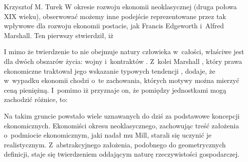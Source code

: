 \begin{artplenv}{Krzysztof M. Turek}
W okresie rozwoju ekonomii neoklasycznej (druga połowa XIX wieku), obserwować możemy inne podejście reprezentowane przez
tak wpływowe dla rozwoju ekonomii postacie, jak Francis Edgeworth i~Alfred Marshall. Ten pierwszy
\parencite[s.~16]{edgeworth_mathematical_1881}
stwierdził, iż 

I mimo że twierdzenie to nie obejmuje natury człowieka w~całości, właściwe jest dla dwóch obszarów życia:
wojny i~kontraktów
\parencite[s.~52]{edgeworth_mathematical_1881}.
Z~kolei Marshall , który prawa ekonomiczne traktował jego
wskazanie typowych tendencji
\parencite[s.~94-95]{marshall_zasady_1925},
dodaje, że w~wypadku ekonomii
chodzi o~te zachowania, których motywy można mierzyć ceną pieniężną. I~pomimo iż przyznaje on, że pomiędzy jednostkami mogą
zachodzić różnice, to:


Na takim gruncie powstało wiele uznawanych do dziś za podstawowe koncepcji ekonomicznych. Ekonomiści okresu
neoklasycznego, zachowując treść założenia o~podmiocie ekonomicznym, jaki nadał mu Mill, starali się uczynić je
realistycznym. Z~abstrakcyjnego założenia, podobnego do geometrycznych definicji, staje się twierdzeniem oddającym
naturę rzeczywistości gospodarczej. 


\end{artplenv}
